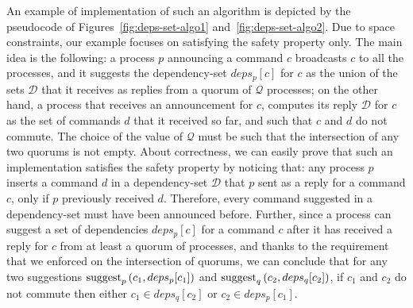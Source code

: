 An example of implementation of such an algorithm is depicted by the pseudocode of Figures~\ref{fig:deps-set-algo1} and~\ref{fig:deps-set-algo2}. Due to space constraints, our example focuses on satisfying the safety property only. The main idea is the following: a process $p$ announcing a command $c$ broadcasts $c$ to all the processes, and it suggests the dependency-set $deps_p[c]$ for $c$ as the union of the sets $\mathcal{D}$ that it receives as replies from a quorum of $\mathcal{Q}$ processes; on the other hand, a process that receives an announcement for $c$, computes its reply $\mathcal{D}$ for $c$ as the set of commands $d$ that it received so far, and such that $c$ and $d$ do not commute. The choice of the value of $\mathcal{Q}$ must be such that the intersection of any two quorums is not empty. About correctness, we can easily prove that such an implementation satisfies the safety property by noticing that:  any process $p$ inserts a command $d$ in a dependency-set $\mathcal{D}$ that $p$ sent as a reply for a command $c$, only if $p$ previously received $d$. Therefore, every command suggested in a dependency-set must have been announced before. Further, since a process can suggest a set of dependencies $deps_p[c]$ for a command $c$ after it has received a reply for $c$ from at least a quorum of processes, and thanks to the requirement that we enforced on the intersection of quorums, we can conclude that for any two suggestions $\operatorname{suggest}_p \left( c_1,deps_p[c_1]\right)$ and $\operatorname{suggest}_q \left( c_2,deps_q[c_2]\right)$,  if $c_1$ and $c_2$ do not commute then either $c_1\in deps_q[c_2]$ or $c_2 \in deps_p[c_1]$.


